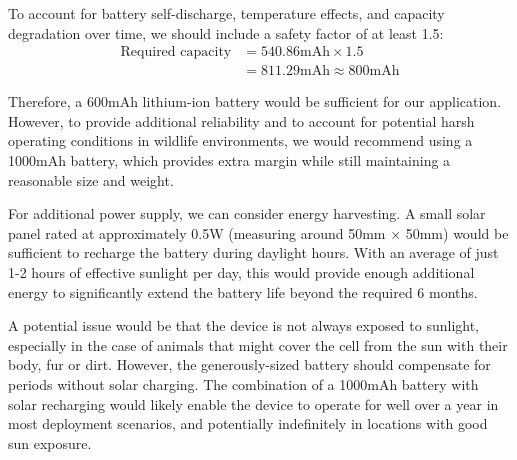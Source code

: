To account for battery self-discharge, temperature effects, and capacity degradation over time, we should include a safety factor of at least 1.5:
\begin{align*}
\text{Required capacity} &= 540.86\text{mAh} \times 1.5 \\
&= 811.29\text{mAh} \approx 800\text{mAh}
\end{align*}

Therefore, a 600mAh lithium-ion battery would be sufficient for our application. However, to provide additional reliability and to account for potential harsh operating conditions in wildlife environments, we would recommend using a 1000mAh battery, which provides extra margin while still maintaining a reasonable size and weight.

For additional power supply, we can consider energy harvesting. 
A small solar panel rated at approximately 0.5W (measuring around 50mm × 50mm) would be sufficient to recharge the battery during daylight hours. With an average of just 1-2 hours of effective sunlight per day, this would provide enough additional energy to significantly extend the battery life beyond the required 6 months. 

A potential issue would be that the device is not always exposed to sunlight, especially in the case of animals that might cover the cell from the sun with their body, fur or dirt. However, the generously-sized battery should compensate for periods without solar charging. The combination of a 1000mAh battery with solar recharging would likely enable the device to operate for well over a year in most deployment scenarios, and potentially indefinitely in locations with good sun exposure.

